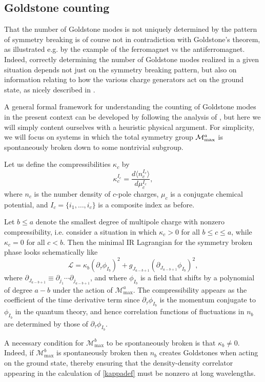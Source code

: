 \documentclass[pra,aps,twocolumn, amsfonts,amsmath,amssymb,nofootinbib,superscriptaddress]{revtex4-2}
\renewcommand{\max}{\text{max}}
\newcommand{\mmax}[1]{\mathcal{M}^{#1}_\max}
\newcommand\be            {\begin{equation}}
\newcommand\ee            {\end{equation}}
\newcommand{\p}{\partial}
\newcommand{\mcm}{\mathcal{M}}
\begin{document}
\subsection{Goldstone counting} \label{sub:subgroup}

That the number of Goldstone modes is not uniquely determined by the pattern of symmetry breaking is of course not in contradiction with Goldstone's theorem, as illustrated e.g. by the example of the ferromagnet vs the antiferromagnet. Indeed, correctly determining the number of Goldstone modes realized in a given situation depends not just on the symmetry breaking pattern, but also on information relating to how the various charge generators act on the ground state, as nicely described in \cite{watanabe2013redundancies}.

A general formal framework for understanding the counting of Goldstone modes in the present context can be developed by following the analysis of \cite{watanabe2013redundancies}, but here we will simply content ourselves with a heuristic physical argument. For simplicity, we will focus on systems in which the total symmetry group $\mcm_{\rm max}^a$ is spontaneously broken down to some nontrivial subgroup. 

Let us define the compressibilities $\kappa_c$ by 
\be \label{kappadef} \kappa_c^{I_c} = \frac{d\langle n_c^{I_c}\rangle}{d\mu_c^{I_c}},\ee 
where $n_c$ is the number density of $c$-pole charges, $\mu_c$ is a conjugate chemical potential, and $I_c = \{i_1,\dots,i_c\}$ is a composite index as before.

Let $b\leq a$ denote the smallest degree of multipole charge with nonzero compressibility, i.e. consider a situation in which $\kappa_c>0$ for all $b\leq c\leq a$, while $\kappa_c=0$ for all $c<b$. Then the minimal IR Lagrangian for the symmetry broken phase looks schematically like 
\be \label{generall} \mathcal{L} = \kappa_b (\partial_\tau \phi_{I_b})^2 + g_{J_{a-b+1}}(\partial_{J_{a-b+1}}\phi_{I_b})^2,\ee 
where 
$\p_{J_{a-b+1}} \equiv \p_{j_1} \cdots \p_{j_{a-b+1}}$, and where $\phi_{I_b}$ is a field that shifts by a polynomial of degree $a-b$ under the action of $\mmax a$. The compressibility appears as the coefficient of the time derivative term since $\p_\tau \phi_{I_b}$ is the momentum conjugate to $\phi_{I_b}$ in the quantum theory, and hence correlation functions of fluctuations in $n_b$ are determined by those of $\p_\tau \phi_{I_b}$. 

A necessary condition for $\mmax b$ to be spontaneously broken is that $\kappa_b \neq 0$. Indeed, if $\mmax b$ is spontaneously broken then $n_b$ creates Goldstones when acting on the ground state, thereby ensuring that the density-density correlator appearing in the calculation of \eqref{kappadef} must be nonzero at long wavelengths. 
\end{document}
